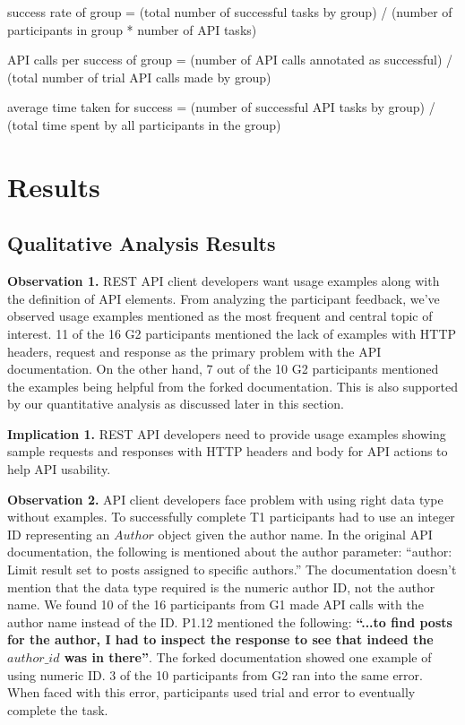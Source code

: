\documentclass[conference]{IEEEtran}
\begin{document}
success rate of group = (total number of successful tasks by group) / (number of participants in group * number of API tasks)

API calls per success of group = (number of API calls annotated as successful) / (total number of trial API calls made by group)

average time taken for success = (number of successful API tasks by group) / (total time spent by all participants in the group)


\section{Results}

\subsection{Qualitative Analysis Results} %

\textbf{Observation 1.} REST API client developers want usage examples along with the definition of API elements. From analyzing the participant feedback, we've observed usage examples mentioned as the most frequent and central topic of interest. 11 of the 16 G2 participants mentioned the lack of examples with HTTP headers, request and response as the primary problem with the API documentation. On the other hand, 7 out of the 10 G2 participants mentioned the examples being helpful from the forked documentation. This is also supported by our quantitative analysis as discussed later in this section.

\textbf{Implication 1.} REST API developers need to provide usage examples showing sample requests and responses with HTTP headers and body for API actions to help API usability.


\textbf{Observation 2.} API client developers face problem with using right data type without examples. To successfully complete T1 participants had to use an integer ID representing an $Author$ object given the author name. In the original API documentation, the following is mentioned about the author parameter: ``author: Limit result set to posts assigned to specific authors.'' The documentation doesn't mention that the data type required is the numeric author ID, not the author name. We found 10 of the 16 participants from G1 made API calls with the author name instead of the ID. P1.12 mentioned the following: \textbf{``...to find posts for the author, I had to inspect the response to see that indeed the $author\_id$ was in there''}. The forked documentation showed one example of using numeric ID. 3 of the 10 participants from G2 ran into the same error. When faced with this error, participants used trial and error to eventually complete the task.
\end{document}
